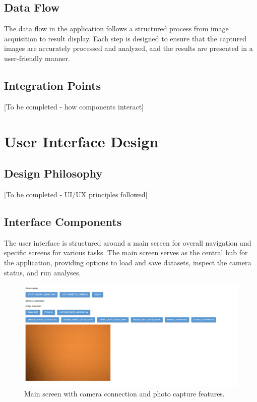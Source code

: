 \subsection{Data Flow}
The data flow in the application follows a structured process from image acquisition to result display. Each step is designed to ensure that the captured images are accurately processed and analyzed, and the results are presented in a user-friendly manner.

\subsection{Integration Points}
[To be completed - how components interact]

\section{User Interface Design}

\subsection{Design Philosophy}
[To be completed - UI/UX principles followed]

\subsection{Interface Components}
The user interface is structured around a main screen for overall navigation and specific screens for various tasks. The main screen serves as the central hub for the application, providing options to load and save datasets, inspect the camera status, and run analyses.

\begin{figure}[h]
\centering
\includegraphics[width=1\textwidth]{Images/ui1.png}
\caption{Main screen with camera connection and photo capture features.}
\label{fig:ui_main_screen}
\end{figure}

